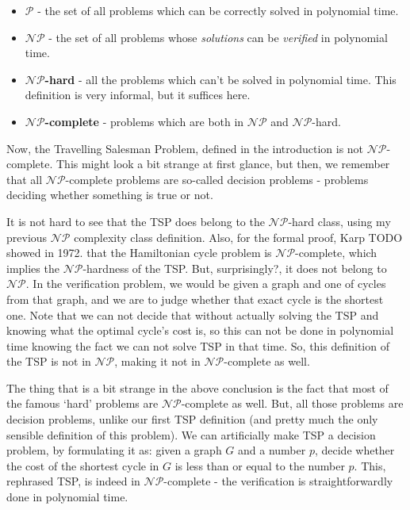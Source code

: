 \documentclass[12pt,twoside,notitlepage]{report}
\begin{document}
\begin{itemize}

\item {\bf $\mathcal{P}$} - the set of all problems which can be correctly solved in polynomial time.
\item {\bf $\mathcal{NP}$} - the set of all problems whose {\it solutions} can be {\it verified} in polynomial time.
\item {\bf $\mathcal{NP}$-hard} - all the problems which can't be solved in polynomial time. This definition is very informal, but it suffices here. %
\item {\bf $\mathcal{NP}$-complete} - problems which are both in $\mathcal{NP}$ and $\mathcal{NP}$-hard.

\end{itemize}

Now, the Travelling Salesman Problem, defined in the introduction is not $\mathcal{NP}$-complete. This might look a bit strange at first glance, but then, we remember that all $\mathcal{NP}$-complete problems are so-called decision problems - problems deciding whether something is true or not.

\smallskip 

It is not hard to see that the TSP does belong to the $\mathcal{NP}$-hard class, using my previous $\mathcal{NP}$ complexity class definition. Also, for the formal proof, Karp TODO showed in 1972. that the Hamiltonian cycle problem is $\mathcal{NP}$-complete, which implies the $\mathcal{NP}$-hardness of the TSP. But, surprisingly?, it does not belong to $\mathcal{NP}$. In the verification problem, we would be given a graph and one of cycles from that graph, and we are to judge whether that exact cycle is the shortest one. Note that we can not decide that without actually solving the TSP and knowing what the optimal cycle's cost is, so this can not be done in polynomial time knowing the fact we can not solve TSP in that time. So, this definition of the TSP is not in $\mathcal{NP}$, making it not in $\mathcal{NP}$-complete as well.

\smallskip 

The thing that is a bit strange in the above conclusion is the fact that most of the famous `hard' problems are $\mathcal{NP}$-complete as well. But, all those problems are decision problems, unlike our first TSP definition (and pretty much the only sensible definition of this problem). We can artificially make TSP a decision problem, by formulating it as: given a graph $G$ and a number $p$, decide whether the cost of the shortest cycle in $G$ is less than or equal to the number $p$. This, rephrased TSP, is indeed in $\mathcal{NP}$-complete - the verification is straightforwardly done in polynomial time.
\end{document}
